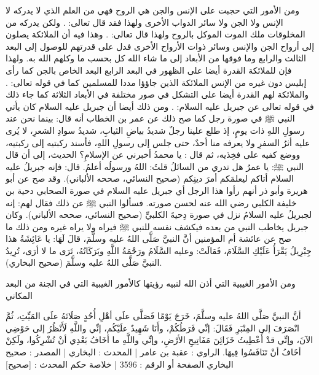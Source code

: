 ومن الأمور التي حجبت على الإنس والجن هي الروح فهي من العلم الذي لا يدركه لا الإنس ولا الجن ولا سائر الدواب الأخرى ولهذا فقد قال تعالى: \quranayah*[17][85]{\footnotesize \surahname*[17]}. ولكن يدركه من المخلوقات ملك الموت الموكل بالروح ولهذا قال تعالى: \quranayah*[32][11]{\footnotesize \surahname*[32]}. وهذا فيه أن الملائكة يصلون إلى أرواح الجن والإنس وسائر ذوات الأرواح الأخرى فدل على قدرتهم للوصول إلى البعد الثالث والرابع وما فوقها من الأبعاد إلى ما شاء الله كل بحسب ما وكلهم الله به. ولهذا فإن للملائكة القدرة أيضا على الظهور في البعد الرابع البعد الخاص بالجن كما رأى إبليس دون غيره من الإنس الملائكة الذين جاؤؤا مددا للمسلمين كما في قوله تعالى: \quranayah*[8][48]{\footnotesize \surahname*[8]}. والملائكة لهم القدرة أيضا على التشكل في صور مختلفة في الأبعاد الثلاثة كما جاء ذلك في قوله تعالى عن جبريل عليه السلام: 
\quranayah*[19][17][5]{\footnotesize \surahname*[19]}. ومن ذلك أيضا أن جبريل عليه السلام كان يأتي النبي ﷺ في صورة رجل كما صح ذلك عن عمر بن الخطاب أنه قال: بينما نحن عند رسولِ اللهِ ذات يومٍ، إذ طلع علينا رجلٌ شديدُ بياضِ الثيابِ، شديدُ سوادِ الشعرِ، لا يُرى عليه أثرُ السفرِ ولا يعرفه منا أحدٌ، حتى جلس إلى رسولِ اللهِ، فأسند ركبتيه إلى ركبتيه، ووضع كفيه على فخِذيه، ثم قال : يا محمدُ أخبرني عن الإسلامِ؟ الحديث، إلى أن قال النبي ﷺ: يا عمرُ هل تدري من السائلُ قلتُ: اللهُ ورسولُه أعلمُ. قال: فإنه جبريلُ عليه السلام أتاكم ليعلمَكم أمرَ دينِكم {\footnotesize (صحيح النسائي، صححه الألباني)}. وقد صح عن أبو هريرة وأبو ذر أنهم رأوا هذا الرجل أي جبريل عليه السلام في صورة الصحابي دحية بن خليفة الكلبي رضي الله عنه لحسن صورته. فسألوا النبي ﷺ عن ذلك فقال لهم: إنه لجبريلُ عليه السلامُ نزل في صورة دِحيةَ الكلبيِّ {\footnotesize (صحيح النسائي، صححه الألباني)}. وكان جبريل يخاطب النبي من بعده فيكشف نفسه للنبي ﷺ فيراه ولا يراه غيره ومن ذلك ما صح عن عائشة أم المؤمنين أنَّ النبيَّ صَلَّى اللهُ عليه وسلَّمَ، قالَ لَهَا: يا عَائِشَةُ هذا جِبْرِيلُ يَقْرَأُ عَلَيْكِ السَّلَامَ، فَقالَتْ: وعليه السَّلَامُ ورَحْمَةُ اللَّهِ وبَرَكَاتُهُ، تَرَى ما لا أرَى، تُرِيدُ النبيَّ صَلَّى اللهُ عليه وسلَّمَ {\footnotesize (صحيح البخاري)}.

ومن الأمور الغيبية التي أذن الله لنبيه رؤيتها كالأمور الغيبية التي في الجنة من البعد المكاني 

أنَّ النبيَّ صَلَّى اللهُ عليه وسلَّمَ، خَرَجَ يَوْمًا فَصَلَّى علَى أهْلِ أُحُدٍ صَلَاتَهُ علَى المَيِّتِ، ثُمَّ انْصَرَفَ إلى المِنْبَرِ فَقَالَ: إنِّي فَرَطُكُمْ، وأَنَا شَهِيدٌ علَيْكُم، إنِّي واللَّهِ لَأَنْظُرُ إلى حَوْضِي الآنَ، وإنِّي قدْ أُعْطِيتُ خَزَائِنَ مَفَاتِيحِ الأرْضِ، وإنِّي واللَّهِ ما أخَافُ بَعْدِي أنْ تُشْرِكُوا، ولَكِنْ أخَافُ أنْ تَنَافَسُوا فِيهَا.
الراوي : عقبة بن عامر | المحدث : البخاري | المصدر : صحيح البخاري
الصفحة أو الرقم : 3596 | خلاصة حكم المحدث : [صحيح] 



